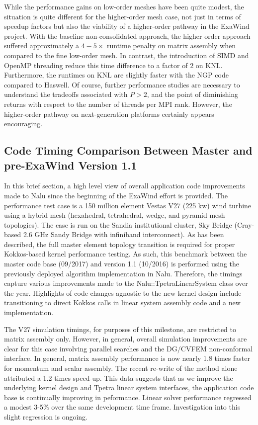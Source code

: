 While the performance gains on low-order meshes have been quite modest, the
situation is quite different for the higher-order mesh case, not just in terms
of speedup factors but also the viability of a higher-order pathway in the
ExaWind project. With the baseline non-consolidated approach, the higher order
approach suffered approximately a $4-5\times$ runtime penalty on matrix assembly
when compared to the fine low-order mesh. In contrast, the introduction of SIMD
and OpenMP threading reduce this time difference to a factor of $2$ on KNL.
Furthermore, the runtimes on KNL are slightly faster with the NGP code
compared to Haswell. Of course, further performance studies are necessary to
understand the tradeoffs associated with $P > 2$, and the point of diminishing
returns with respect to the number of threads per MPI rank. However, the
higher-order pathway on next-generation platforms certainly appears encouraging.

\subsection{Code Timing Comparison Between Master and pre-ExaWind Version 1.1}
In this brief section, a high level view of overall application code improvements made to 
Nalu since the beginning of the ExaWind effort is provided. The performance test case is a 
150 million element Vestas V27 (225 kw) wind turbine using a hybrid mesh (hexahedral, tetrahedral, wedge,
and pyramid mesh topologies). The case is run on the Sandia institutional cluster, Sky Bridge (Cray-based
2.6 GHz Sandy Bridge with infiniband interconnect). As has been described, the full master element topology transition
is required for proper Kokkos-based kernel performance testing. As such, this benchmark between
the master code base (09/2017) and version 1.1 (10/2016) is performed using the previously deployed
algorithm implementation in Nalu. Therefore, the timings capture various improvements made to
the Nalu::TpetraLinearSystem class over the year. Highlights of code changes agnostic to the new kernel
design include transitioning to direct Kokkos calls in linear system assembly code and a new  
implementation.

The V27 simulation timings, for purposes of this milestone, are restricted to matrix assembly only. However, 
in general, overall simulation improvements are clear for this case involving parallel searches and the 
DG/CVFEM non-conformal interface. In general, matrix assembly performance is now nearly 1.8 times faster 
for momentum and scalar assembly. The recent re-write of the  method alone attributed a 1.2 
times speed-up. This data suggests that as we improve the 
underlying kernel design and Tpetra linear system interfaces, the application code base is continually 
improving in peformance. Linear solver performance regressed a modest 3-5\% over the same development time 
frame. Investigation into this slight regression is ongoing.

